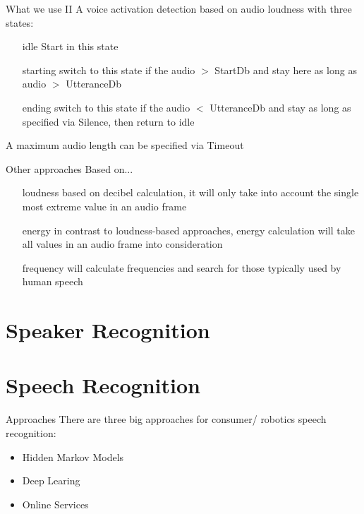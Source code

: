 \documentclass{beamer}
\begin{document}
	\begin{frame}{What we use II}
		A voice activation detection based on audio loudness with three states: 
		\begin{itemize}[leftmargin=*,labelindent=32pt]
			\item[idle] Start in this state
			\item[starting] switch to this state if the audio $>$ StartDb and stay here as long as audio $>$ UtteranceDb
			\item[ending] switch to this state if the audio $<$ UtteranceDb and stay as long as specified via Silence, then return to idle
		\end{itemize}
		A maximum audio length can be specified via Timeout
	\end{frame}
	
	\begin{frame}{Other approaches}
		Based on...
		\begin{itemize}[leftmargin=*,labelindent=32pt]
			\item[loudness] based on decibel calculation, it will only take into account the single most extreme value in an audio frame
			\item[energy] in contrast to loudness-based approaches, energy calculation will take all values in an audio frame into consideration
			\item[frequency] will calculate frequencies and search for those typically used by human speech
		\end{itemize}
	\end{frame}
	
	\section{Speaker Recognition}%
	
	\section{Speech Recognition}%
	
	\begin{frame}{Approaches}
		There are three big approaches for consumer/ robotics speech recognition:
		\begin{itemize}
			\item Hidden Markov Models
			\item Deep Learing
			\item Online Services
		\end{itemize}
	\end{frame}
	
\end{document}
